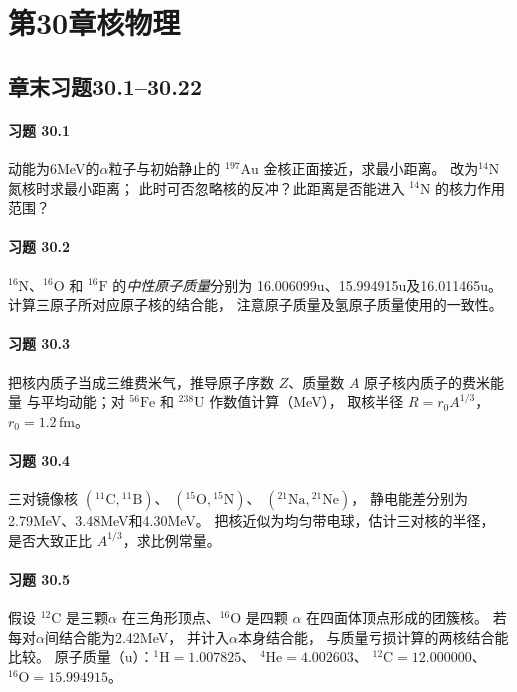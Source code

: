 \section*{第30章\quad 核物理}
\subsection*{章末习题30.1--30.22}
\paragraph{习题 30.1}
动能为6MeV的\(\alpha\)粒子与初始静止的
\({}^{197}\mathrm{Au}\) 金核正面接近，求最小距离。
改为\({}^{14}\mathrm N\) 氮核时求最小距离；
此时可否忽略核的反冲？此距离是否能进入
\({}^{14}\mathrm N\) 的核力作用范围？
\paragraph{习题 30.2}
\({}^{16}\mathrm N\)、\({}^{16}\mathrm O\) 和
\({}^{16}\mathrm F\) 的\emph{中性原子质量}分别为
16.006099u、15.994915u及16.011465u。
计算三原子所对应原子核的结合能，
注意原子质量及氢原子质量使用的一致性。
\paragraph{习题 30.3}
把核内质子当成三维费米气，推导原子序数
\(Z\)、质量数 \(A\) 原子核内质子的费米能量
与平均动能；对 \({}^{56}\mathrm{Fe}\) 和
\({}^{238}\mathrm U\) 作数值计算（MeV），
取核半径 \(R=r_0A^{1/3}\)，\(r_0=1.2\,\mathrm{fm}\)。
\paragraph{习题 30.4}
三对镜像核
\(({}^{11}\mathrm C,{}^{11}\mathrm B)\)、
\(({}^{15}\mathrm O,{}^{15}\mathrm N)\)、
\(({}^{21}\mathrm{Na},{}^{21}\mathrm{Ne})\)，
静电能差分别为2.79MeV、3.48MeV和4.30MeV。
把核近似为均匀带电球，估计三对核的半径，
是否大致正比 \(A^{1/3}\)，求比例常量。
\paragraph{习题 30.5}
假设 \({}^{12}\mathrm C\) 是三颗\(\alpha\)
在三角形顶点、\({}^{16}\mathrm O\) 是四颗
\(\alpha\) 在四面体顶点形成的团簇核。
若每对\(\alpha\)间结合能为2.42MeV，
并计入\(\alpha\)本身结合能，
与质量亏损计算的两核结合能比较。
原子质量（u）：\({}^{1}\mathrm H=1.007825\)、
\({}^{4}\mathrm{He}=4.002603\)、
\({}^{12}\mathrm C=12.000000\)、
\({}^{16}\mathrm O=15.994915\)。
